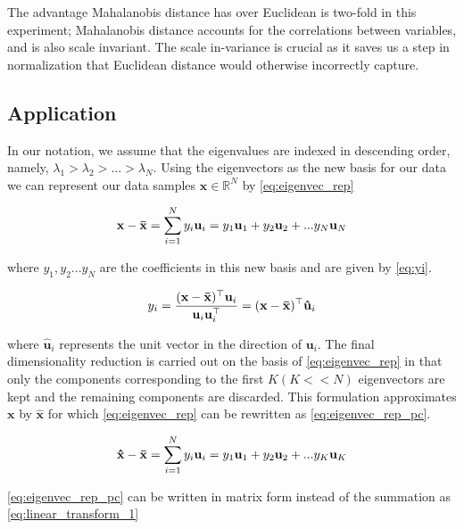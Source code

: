 \documentclass[headings=optiontoheadandtoc,listof=totoc,parskip=full]{scrartcl}
\def \reals {\mathbb{R}}
\begin{document}
The advantage Mahalanobis distance has over Euclidean is two-fold in this experiment; Mahalanobis distance accounts for the correlations between variables, and is also scale invariant. The scale in-variance is crucial as it saves us a step in normalization that Euclidean distance would otherwise incorrectly capture.


\subsection{Application}
\label{sec:theory-application}
In our notation, we assume that the eigenvalues are indexed in descending order, namely, $\lambda_1 > \lambda_2 > ... > \lambda_N$. Using the eigenvectors as the new basis for our data we can represent our data samples $\mathbf{x} \in \reals^N$ by \cref{eq:eigenvec_rep}

\begin{equation}\label{eq:eigenvec_rep}
    \mathbf{x} - \mathbf{\Bar{x}} = \sum_{i = 1}^N y_i\mathbf{u}_i = y_1\mathbf{u}_1 + y_2\mathbf{u}_2 + ... y_N\mathbf{u}_N
\end{equation}

where $y_1, y_2 ... y_N$ are the coefficients in this new basis and are given by \cref{eq:yi}.

\begin{equation}\label{eq:yi}
    y_i = \frac{(\mathbf{x} - \mathbf{\Bar{x}})^\top \mathbf{u}_i}{\mathbf{u}_i\mathbf{u}_i^\top} = (\mathbf{x} - \mathbf{\Bar{x}})^\top\mathbf{\hat{u}}_i
\end{equation}

where $\mathbf{\hat{u}}_i$ represents the unit vector in the direction of $\mathbf{u}_i$. The final dimensionality reduction is carried out on the basis of \cref{eq:eigenvec_rep} in that only the components corresponding to the first $K (K << N)$ eigenvectors are kept and the remaining components are discarded. This formulation approximates $\mathbf{x}$ by $\mathbf{\hat{x}}$ for which \cref{eq:eigenvec_rep} can be rewritten as \cref{eq:eigenvec_rep_pc}.

\begin{equation}\label{eq:eigenvec_rep_pc}
    \mathbf{\hat{x}} - \mathbf{\Bar{x}} = \sum_{i = 1}^N y_i\mathbf{u}_i = y_1\mathbf{u}_1 + y_2\mathbf{u}_2 + ... y_K\mathbf{u}_K
\end{equation}

\cref{eq:eigenvec_rep_pc} can be written in matrix form instead of the summation as \cref{eq:linear_transform_1}
\end{document}
